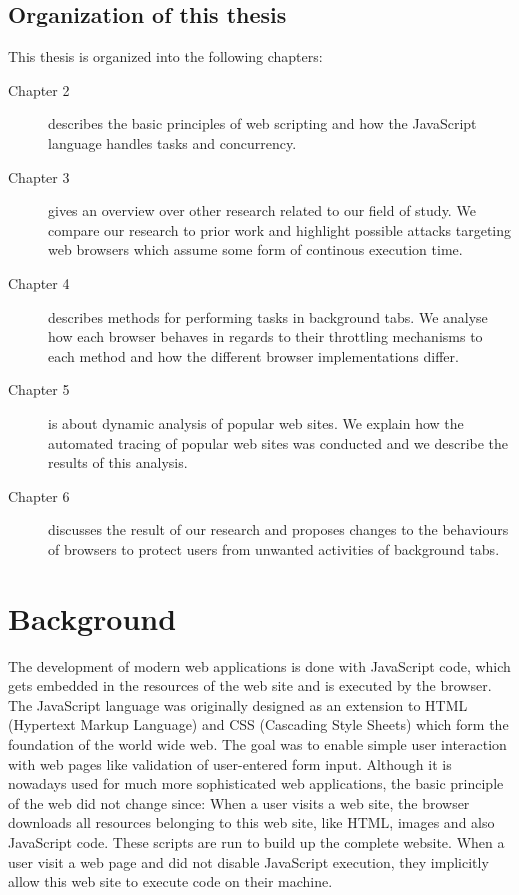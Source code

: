 \documentclass[
	ruledheaders=section,%
	class=report,%
	thesis={type=bachelor},%
	accentcolor=9c,%
	custommargins=true,%
	marginpar=false,%
	parskip=half-,%
	fontsize=11pt,%
]{tudapub}
\begin{document}
  \section{Organization of this thesis}

  This thesis is organized into the following chapters:

  \begin{description}
  \item[Chapter 2] describes the basic principles of web scripting and how the JavaScript language handles tasks and concurrency.
    
  \item[Chapter 3] gives an overview over other research related to our field of study. We compare our research to prior work and highlight possible attacks targeting web browsers which assume some form of continous execution time.
    
  \item[Chapter 4] describes methods for performing tasks in background tabs. We analyse how each browser behaves in regards to their throttling mechanisms to each method and how the different browser implementations differ.
    
  \item[Chapter 5] is about dynamic analysis of popular web sites. We explain how the automated tracing of popular web sites was conducted and we describe the results of this analysis.
    
  \item[Chapter 6] discusses the result of our research and proposes changes to the behaviours of browsers to protect users from unwanted activities of background tabs.
  \end{description} 

  
  \newpage
  \chapter{Background}
  
  The development of modern web applications is done with JavaScript code, which gets embedded in the resources of the web site and is executed by the browser. The JavaScript language was originally designed as an extension to HTML (Hypertext Markup Language) and CSS (Cascading Style Sheets) which form the foundation of the world wide web. The goal was to enable simple user interaction with web pages like validation of user-entered form input. Although it is nowadays used for much more sophisticated web applications, the basic principle of the web did not change since: When a user visits a web site, the browser downloads all resources belonging to this web site, like HTML, images and also JavaScript code. These scripts are run to build up the complete website. When a user visit a web page and did not disable JavaScript execution, they implicitly allow this web site to execute code on their machine.
\end{document}
